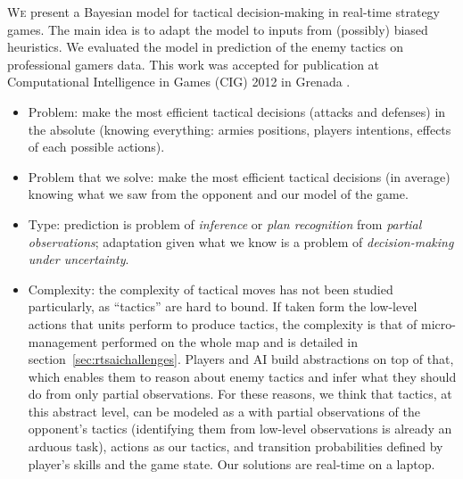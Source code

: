 


\lettrine{W}{e} present a Bayesian model for tactical decision-making in real-time strategy games. The main idea is to adapt the model to inputs from (possibly) biased heuristics. We evaluated the model in prediction of the enemy tactics on professional gamers data. This work was accepted for publication at Computational Intelligence in Games (CIG) 2012 in Grenada \citep{SYNNAEVE:Tactics}.

\chaptertoc

\begin{itemize}
\item Problem: make the most efficient tactical decisions (attacks and defenses) in the absolute (knowing everything: armies positions, players intentions, effects of each possible actions).
\item Problem that we solve: make the most efficient tactical decisions (in average) knowing what we saw from the opponent and our model of the game. 
\item Type: prediction is problem of \textit{inference} or \textit{plan recognition} from \textit{partial observations}; adaptation given what we know is a problem of \textit{decision-making under uncertainty}. 
\item Complexity: the complexity of tactical moves has not been studied particularly, as ``tactics'' are hard to bound. If taken form the low-level actions that units perform to produce tactics, the complexity is that of micro-management performed on the whole map and is detailed in section~\ref{sec:rtsaichallenges}. Players and AI build abstractions on top of that, which enables them to reason about enemy tactics and infer what they should do from only partial observations. For these reasons, we think that tactics, at this abstract level, can be modeled as a  with partial observations of the opponent's tactics (identifying them from low-level observations is already an arduous task), actions as our tactics, and transition probabilities defined by player's skills and the game state. %
Our solutions are real-time on a laptop.
\end{itemize}

